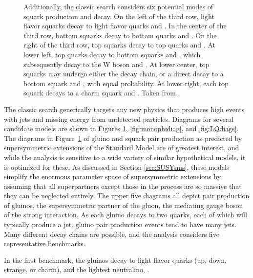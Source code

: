 \begin{figure}[h!]
{Additionally, the classic search considers six potential modes of squark production and decay.
On the left of the third row, light flavor squarks decay to light flavor quarks and \lsp.
In the center of the third row, bottom squarks decay to bottom quarks and \lsp.
On the right of the third row, top squarks decay to top quarks and \lsp.
At lower left, top quarks decay to bottom squarks and \chargino, which subsequently decay to the W boson and \lsp.
At lower center, top squarks may undergo either the \chargino decay chain, or a direct decay to a bottom squark and \lsp, with equal probability.
At lower right, each top squark decays to a charm squark and \lsp.
Taken from \cite{MT2_2019}.}
    \label{fig:susyproduction}
  \end{figure}  

    The classic search generically targets any new physics that produces high \Ht events with jets and missing energy from undetected particles.
    Diagrams for several candidate models are shown in Figures \ref{fig:susyproduction}, \ref{fig:monophidiag}, and \ref{fig:LQdiags}.
    The diagrams in Figure~\ref{fig:susyproduction} of gluino and squark pair production as predicted by supersymmetric extensions of the Standard Model are of greatest interest, and while the analysis is sensitive to a wide variety of similar hypothetical models, it is optimized for these.
    As discussed in Section \ref{sec:SUSYsms}, these models simplify the enormous parameter space of supersymmetric extensions by assuming that all superpartners except those in the process are so massive that they can be neglected entirely.
    The upper five diagrams all depict pair production of gluinos, the supersymmetric partner of the gluon, the mediating gauge boson of the strong interaction.
    As each gluino decays to two quarks, each of which will typically produce a jet, gluino pair production events tend to have many jets.
    Many different decay chains are possible, and the analysis considers five representative benchmarks.

    In the first benchmark, the gluinos decay to light flavor quarks (up, down, strange, or charm), and the lightest neutralino, \lsp.


